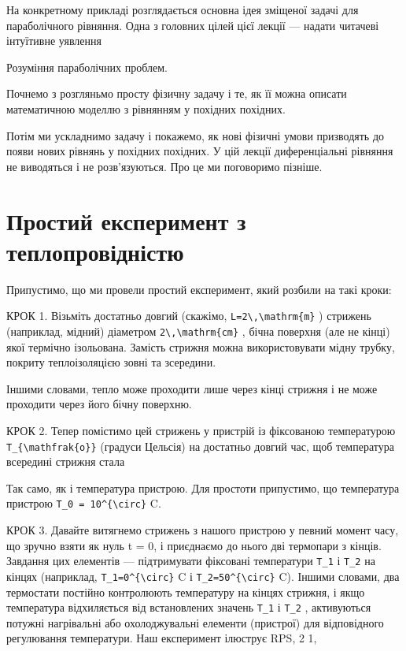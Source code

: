 \documentclass[
  ukrainian,
]{article}
\begin{document}
На конкретному прикладі розглядається основна ідея зміщеної задачі для
параболічного рівняння. Одна з головних цілей цієї лекції --- надати
читачеві інтуїтивне уявлення

Розуміння параболічних проблем.

Почнемо з розгляньмо просту фізичну задачу і те, як її можна описати
математичною моделлю з рівнянням у похідних похідних.

Потім ми ускладнимо задачу і покажемо, як нові фізичні умови призводять
до появи нових рівнянь у похідних похідних. У цій лекції диференціальні
рівняння не виводяться і не розв'язуються. Про це ми поговоримо пізніше.

\section{Простий експеримент з
теплопровідністю}\label{ux43fux440ux43eux441ux442ux438ux439-ux435ux43aux441ux43fux435ux440ux438ux43cux435ux43dux442-ux437-ux442ux435ux43fux43bux43eux43fux440ux43eux432ux456ux434ux43dux456ux441ux442ux44e}

Припустимо, що ми провели простий експеримент, який розбили на такі
кроки:

КРОК 1. Візьміть достатньо довгий (скажімо,
\texttt{L=2\textbackslash{},\textbackslash{}mathrm\{m\}} ) стрижень
(наприклад, мідний) діаметром
\texttt{2\textbackslash{},\textbackslash{}mathrm\{cm\}} , бічна поверхня
(але не кінці) якої термічно ізольована. Замість стрижня можна
використовувати мідну трубку, покриту теплоізоляцією зовні та зсередини.

Іншими словами, тепло може проходити лише через кінці стрижня і не може
проходити через його бічну поверхню.

КРОК 2. Тепер помістимо цей стрижень у пристрій із фіксованою
температурою \texttt{T\_\{\textbackslash{}mathfrak\{o\}\}} (градуси
Цельсія) на достатньо довгий час, щоб температура всередині стрижня
стала

Так само, як і температура пристрою. Для простоти припустимо, що
температура пристрою \texttt{T\_0\ =\ 10\^{}\{\textbackslash{}circ\}} C.

КРОК 3. Давайте витягнемо стрижень з нашого пристрою у певний момент
часу, що зручно взяти як нуль t = 0, і приєднаємо до нього дві термопари
з кінців. Завдання цих елементів --- підтримувати фіксовані температури
\texttt{T\_1} і \texttt{T\_2} на кінцях (наприклад,
\texttt{T\_1=0\^{}\{\textbackslash{}circ\}} C і
\texttt{T\_2=50\^{}\{\textbackslash{}circ\}} C). Іншими словами, два
термостати постійно контролюють температуру на кінцях стрижня, і якщо
температура відхиляється від встановлених значень \texttt{T\_1} і
\texttt{T\_2} , активуються потужні нагрівальні або охолоджувальні
елементи (пристрої) для відповідного регулювання температури. Наш
експеримент ілюструє RPS, 2 1,
\end{document}
